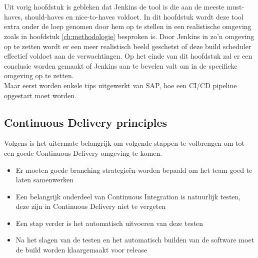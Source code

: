 
\chapter{}
\label{ch:proof-of-concept}
Uit vorig hoofdstuk is gebleken dat Jenkins de tool is die aan de meeste must-haves, should-haves en nice-to-haves voldoet. In dit hoofdstuk wordt deze tool extra onder de loep genomen door hem op te stellen in een realistische omgeving zoals in hoofdstuk \ref{ch:methodologie} besproken is. Door Jenkins in zo'n omgeving op te zetten wordt er een meer realistisch beeld geschetst of deze build scheduler effectief voldoet aan de verwachtingen. Op het einde van dit hoofdstuk zal er een conclusie worden gemaakt of Jenkins aan te bevelen valt om in de specifieke omgeving op te zetten.\\
Maar eerst worden enkele tips uitgewerkt van SAP, hoe een CI/CD pipeline opgestart moet worden.

\section{Continuous Delivery principles}
\label{sec:continuous-delivery-principles}
Volgens \textcite{Riti2018} is het uitermate belangrijk om volgende stappen te volbrengen om tot een goede Continuous Delivery omgeving te komen.
\begin{itemize}
    \item Er moeten goede branching strategieën worden bepaald om het team goed te laten samenwerken
    \item Een belangrijk onderdeel van Continuous Integration is natuurlijk testen, deze zijn in Continuous Delivery niet te vergeten
    \item Een stap verder is het automatisch uitvoeren van deze testen
    \item Na het slagen van de testen en het automatisch builden van de software moet de build worden klaargemaakt voor release
\end{itemize}

